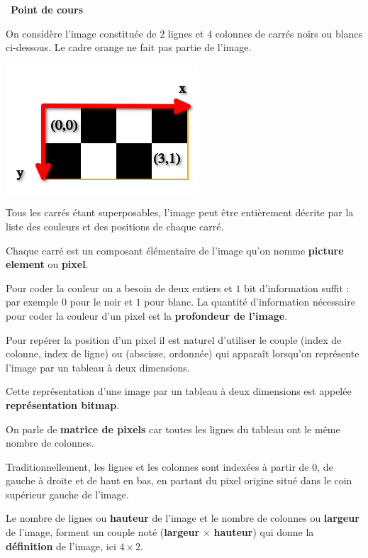 \documentclass[a4paper, french, 12pt]{article}
\newcounter{cours}
\newenvironment{cours}[1]
{\par \medskip   \addtocounter{cours}{1} \noindent  
\begin{bclogo}[arrondi =0.1,  ombre = true, barre=none, logo=\bcbook, marge=4]{~\textbf{Point de cours} \textbf{\thecours} {\itshape #1} }  \par}
{
\end{bclogo}
 \par \bigskip }
\begin{document}
\begin{cours}{}
On considère l'image constituée de $2$ lignes et $4$ colonnes de carrés noirs ou blancs ci-dessous. Le cadre orange ne fait pas partie de l'image.

\begin{center}
\includegraphics[scale=1]{images/exemple_binaire_cadre.png}
\end{center} 

Tous les  carrés étant superposables, l'image peut être entièrement décrite par la liste des couleurs et des  positions de chaque carré.

Chaque carré est un composant élémentaire de l'image qu'on nomme \textbf{picture element} ou \textbf{pixel}.

Pour coder la   couleur on a besoin de deux entiers et $1$ bit d'information suffit : par exemple   $0$ pour le noir et $1$ pour blanc.  La quantité d'information nécessaire pour coder la couleur d'un pixel est la \textbf{profondeur de l'image}.

Pour repérer la position d'un pixel il est naturel  d'utiliser le couple (index de colonne, index de ligne) ou (abscisse, ordonnée) qui apparaît lorsqu'on  représente  l'image par un tableau à deux dimensions.

Cette représentation d'une image par un tableau à deux dimensions est appelée \textbf{représentation bitmap}.

On parle de \textbf{matrice de pixels} car toutes les lignes du tableau ont le même nombre de colonnes.

Traditionnellement, les lignes et les colonnes sont indexées à partir de 0, de gauche à droite et de haut en bas, en partant du   pixel origine situé dans le coin supérieur gauche de l'image.

Le nombre de lignes ou \textbf{hauteur} de l'image et le nombre de colonnes ou \textbf{largeur} de l'image, forment un couple noté (\textbf{largeur} $\times$ \textbf{hauteur}) qui donne la \textbf{définition} de l'image, ici $4 \times 2$.




\end{cours}
\end{document}
